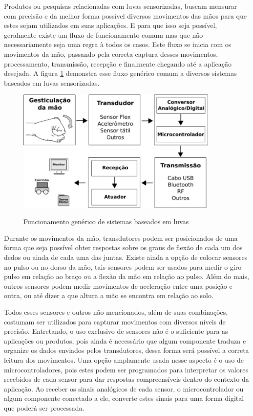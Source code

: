 \documentclass[
	12pt,				%
	openright,			%
	oneside,			%
	a4paper,			%
	english,			%
	brazil				%
	]{abntex2}
\begin{document}
		Produtos ou pesquisas relacionadas com luvas sensorizadas, buscam mensurar com precisão e da melhor forma possível diversos movimentos das mãos para que estes sejam utilizados em suas aplicações. E para que isso seja possível, geralmente existe um fluxo de funcionamento comum mas que não necessariamente seja uma regra à todos os casos. Este fluxo se inicia com os movimentos da mão, passando pela correta captura desses movimentos, processamento, transmissão, recepção e finalmente chegando até a aplicação desejada. A figura \ref{Fig:flowchart1} demonstra esse fluxo genérico comum a diversos sistemas baseados em luvas sensorizadas.

		\begin{figure}[h!]
			\centering
			\caption{Funcionamento genérico de sistemas baseados em luvas}
  		\includegraphics[width=10cm]{./figures/flowchart1.png}
  		\label{Fig:flowchart1}
		\end{figure}

		Durante os movimentos da mão, transdutores podem ser posicionados de uma forma que seja possível obter respostas sobre os graus de flexão de cada um dos dedos ou ainda de cada uma das juntas. Existe ainda a opção de colocar sensores no pulso ou no dorso da mão, tais sensores podem ser usados para medir o giro pulso em relação ao braço ou a flexão da mão em relação ao pulso. Além do mais, outros sensores podem medir movimentos de aceleração entre uma posição e outra, ou até dizer a que altura a mão se encontra em relação ao solo.
		
		Todos esses sensores e outros não mencionados, além de suas combinações, costumam ser utilizados para capturar movimentos com diversos níveis de precisão. Entretando, o uso exclusivo de sensores não é o suficiente para as aplicações ou produtos, pois ainda é necessário que algum componente traduza e organize os dados enviados pelos transdutores, dessa forma será possível a correta leitura dos movimentos. Uma opção amplamente usada nesse aspecto é o uso de microcontroladores, pois estes podem ser programados para interpretar os valores recebidos de cada sensor para dar respostas compreensíveis dentro do contexto da aplicação. Ao receber os sinais analógicos de cada sensor, o microcontrolador ou algum componente conectado a ele, converte estes sinais para uma forma digital que poderá ser processada. 
	
\end{document}
